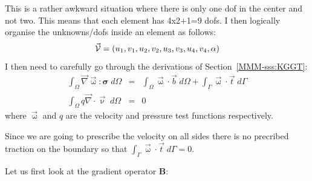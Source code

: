 This is a rather awkward situation where there is only one dof in the center and not two. 
This means that each element has 4x2+1=9 dofs. 
I then logically organise the unknowns/dofs inside an element as follows:
\[
\vec{\cal V}=(u_1,v_1,u_2,v_2,u_3,v_3,u_4,v_4,\alpha)
\]
I then need to carefully go through the derivations of Section~\ref{MMM-sss:KGGT}:
\begin{eqnarray}
\int_\Omega \vec\nabla \vec{\upomega} : {\bm \sigma} \; d\Omega
&=& \int_\Omega \vec\upomega \cdot \vec{b} \; d\Omega 
+ \int_\Gamma \vec\upomega \cdot \vec{t} \; d\Gamma \\
\int_\Omega q \vec\nabla \cdot \vec{\upnu} \; d\Omega &=& 0
\end{eqnarray}
where $\vec\upomega$ and $q$ are the velocity and pressure test functions respectively. 

Since we are going to prescribe the velocity on all sides there is no precribed 
traction on the boundary so that $\int_\Gamma \vec\upomega \cdot \vec{t} \; d\Gamma=0$.

Let us first look at the gradient operator ${\bm B}$:

